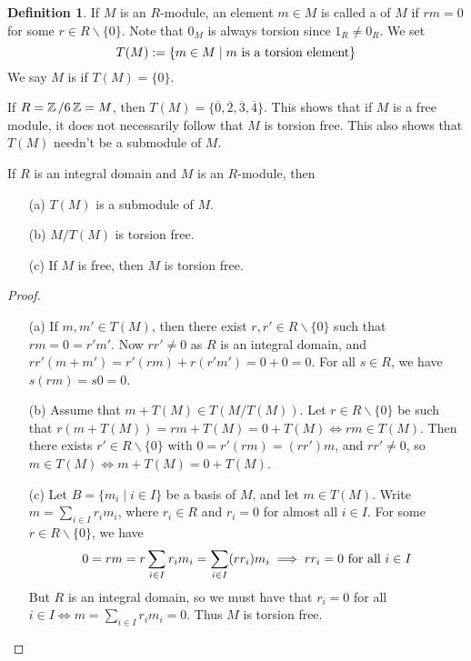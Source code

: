 \documentclass[11pt]{book}
\theoremstyle{definition}   \newtheorem{defn}[counter]{Definition} %
\newcommand{\ov}{\overline}   \newcommand{\wt}{\widetilde}
\newcommand{\bs}{\backslash}   \newcommand{\A}{\mathcal{A}}   \newcommand{\sy}{\textnormal{Syl}}   \newcommand{\size}[1]{\left| #1 \right|}
\newcommand{\vs}{\vspace{8pt}}
\numberwithin{counter}{chapter}
\begin{document}
\vs

\begin{defn}
If $M$ is an $R$-module, an element $m \in M$ is called a  of $M$ if $rm = 0$ for some $r \in R \bs \{0\}$. Note that $0_M$ is always torsion since $1_R \ne 0_R$. We set
	\[ T(M) := \{m \in M \mid m \textnormal{ is a torsion element} \} \]
We say $M$ is  if $T(M) = \{0\}$.
\end{defn}

\vs

\begin{example}
If $R = \operatorname{\mathbb{Z}}/6\operatorname{\mathbb{Z}} = M$, then $T(M) = \{\ov{0},\ov{2},\ov{3},\ov{4}\}$. This shows that if $M$ is a free module, it does not necessarily follow that $M$ is torsion free. This also shows that $T(M)$ needn't be a submodule of $M$.
\end{example}

\vs

\begin{lemma}
If $R$ is an integral domain and $M$ is an $R$-module, then
\begin{enumerate}
\item[(a)] $T(M)$ is a submodule of $M$.
\item[(b)] $M/T(M)$ is torsion free.
\item[(c)] If $M$ is free, then $M$ is torsion free.
\end{enumerate}
\end{lemma}

\vs

\begin{proof}\
\begin{enumerate}
\item[(a)] If $m,m' \in T(M)$, then there exist $r,r' \in R \bs \{0\}$ such that $rm = 0 = r'm'$. Now $rr' \ne 0$ as $R$ is an integral domain, and $rr'(m + m') = r'(rm) + r(r'm') = 0 + 0 = 0$. For all $s \in R$, we have $s(rm) = s 0 = 0$.

\item[(b)] Assume that $m + T(M) \in T(M/T(M))$. Let $r \in R \bs \{0\}$ be such that $r(m + T(M)) = rm + T(M) = 0 + T(M) \iff rm \in T(M)$. Then there exists $r' \in R \bs \{0\}$ with $0 = r'(rm) = (rr')m$, and $rr' \ne 0$, so $m \in T(M) \iff m + T(M) = 0 + T(M)$.

\item[(c)] Let $B = \{m_i \mid i \in I\}$ be a basis of $M$, and let $m \in T(M)$. Write $m = \sum_{i \in I} r_i m_i$, where $r_i \in R$ and $r_i = 0$ for almost all $i \in I$. For some $r \in R \bs \{0\}$, we have
	\[0 = rm = r \sum_{i \in I} r_i m_i = \sum_{i \in I} (rr_i) m_i \implies rr_i = 0 \textnormal{ for all } i \in I \]
But $R$ is an integral domain, so we must have that $r_i = 0$ for all $i \in I \iff m = \sum_{i \in I} r_i m_i = 0$. Thus $M$ is torsion free.
\end{enumerate}
\end{proof}
\end{document}
